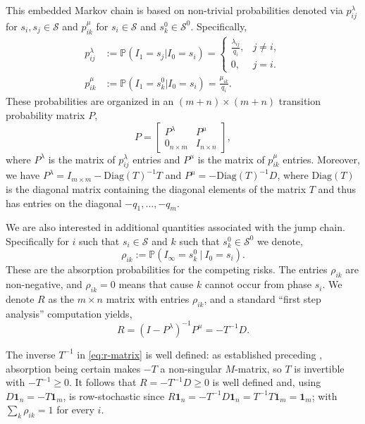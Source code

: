 \documentclass{article}
\newcommand{\cs}{\mathcal{S}}
\newcommand{\subchg}[1]{#1}
\begin{document}
This embedded Markov chain is based on non-trivial probabilities denoted via $p_{ij}^\lambda$ for $s_i,s_j \in \cs$ and $p_{ik}^\mu$ for $s_i \in \cs$ and $s^0_k \in \cs^0$. Specifically,
%
\begin{align}
\label{eq:transition_prob}
   p_{ij}^\lambda & :=\mathbb{P}(I_{1}=s_j\vert I_0=s_i)=
\begin{cases}
\frac{\lambda_{ij}}{q_i}, & j\neq i,\\
0, & j = i.
\end{cases}  
%
\\
%
p_{ik}^\mu & :=\mathbb{P}(I_{1}=s^0_k\vert I_0=s_i)=
\frac{\mu_{ik}}{q_i}.
\end{align}
These probabilities are organized in an $(m+n) \times (m+n)$ transition probability matrix $P$,
%
\begin{equation}\label{eq:transition_matrix}
    P = \begin{bmatrix}
        P^\lambda & P^\mu\\
        0_{n\times m} &  I_{n \times n}
    \end{bmatrix},
\end{equation}
%
where $P^\lambda$ is the matrix of $p_{ij}^\lambda$ entries and $P^\mu$ is the matrix of $p_{ik}^\mu$ entries. Moreover,
we have $P^\lambda = I_{m\times m} - \mathrm{Diag}(T)^{-1} T$  and $P^\mu = -\mathrm{Diag}(T)^{-1}D$, where $\mathrm{Diag}(T)$ is the diagonal matrix containing the diagonal elements of the matrix $T$ and thus has entries on the diagonal $-q_1,\ldots,-q_m$.

We are also interested in additional quantities associated with the jump chain. Specifically for $i$ such that $s_i \in \cs$ and $k$ such that $s^0_k \in \cs^0$ we denote,
%
\begin{equation}\label{eq:rho_ik}
\rho_{ik}:= \mathbb{P}(I_{\infty}= s^0_k ~\vert~ I_0 = s_i).
\end{equation}
%
These are the absorption probabilities for the competing risks. \subchg{The entries $\rho_{ik}$ are non-negative, and $\rho_{ik}=0$ means that cause $k$ cannot occur from phase $s_i$.} We denote $R$ as the $m \times n$ matrix with entries $\rho_{ik}$, and a standard ``first step analysis'' computation yields,
%
\begin{equation}
\label{eq:r-matrix}    
R = (I - P^\lambda)^{-1}P^\mu = -T^{-1}D.
\end{equation}

The inverse $T^{-1}$ in \eqref{eq:r-matrix} is well defined: as established preceding , absorption being certain makes $-T$ a non-singular $M$-matrix, so $T$ is invertible with $-T^{-1} \ge 0$. It follows that $R = -T^{-1}D \ge 0$ is well defined and, using $D\mathbf{1}_n = -T\mathbf{1}_m$, is row-stochastic since $R\mathbf{1}_n = -T^{-1}D\mathbf{1}_n = T^{-1}T\mathbf{1}_m = \mathbf{1}_m$; \subchg{with $\sum_k \rho_{ik} = 1$ for every $i$}.
\end{document}
